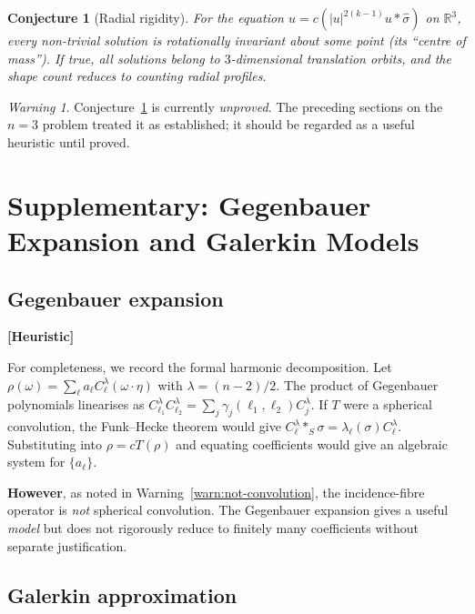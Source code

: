 \documentclass[12pt]{article}
\newtheorem{conjecture}[theorem]{Conjecture}
\theoremstyle{definition}
\theoremstyle{remark}
\newtheorem{warning}[theorem]{Warning}
\newcommand{\R}{\mathbb{R}}
\newcommand{\wh}{\widehat}
\newcommand{\heuristic}{\textbf{\color{purple}[Heuristic]}}
\begin{document}
\begin{conjecture}[Radial rigidity]
  \label{conj:radial}
  For the equation $u=c(|u|^{2(k-1)}u\ast\wh\sigma)$ on $\R^3$, every
  non-trivial solution is rotationally invariant about some point (its
  ``centre of mass'').  If true, all solutions belong to $3$-dimensional
  translation orbits, and the shape count reduces to counting radial profiles.
\end{conjecture}

\begin{warning}
  Conjecture~\ref{conj:radial} is currently \emph{unproved}.  The
  preceding sections on the $n=3$ problem treated it as established; it
  should be regarded as a useful heuristic until proved.
\end{warning}

\section{Supplementary: Gegenbauer Expansion and Galerkin Models}
\label{sec:galerkin}

\subsection{Gegenbauer expansion}
\heuristic

For completeness, we record the formal harmonic decomposition.
Let $\rho(\omega)=\sum_\ell a_\ell C_\ell^\lambda(\omega\cdot\eta)$ with
$\lambda=(n-2)/2$.  The product of Gegenbauer polynomials linearises as
$C_{\ell_1}^\lambda C_{\ell_2}^\lambda
=\sum_j\gamma_j(\ell_1,\ell_2)C_j^\lambda$.
If $T$ were a spherical convolution, the Funk--Hecke theorem would give
$C_\ell^\lambda\ast_S\sigma=\lambda_\ell(\sigma)C_\ell^\lambda$.
Substituting into $\rho=cT(\rho)$ and equating coefficients would give an
algebraic system for $\{a_\ell\}$.

\textbf{However}, as noted in Warning~\ref{warn:not-convolution}, the
incidence-fibre operator is \emph{not} spherical convolution.  The
Gegenbauer expansion gives a useful \emph{model} but does not rigorously
reduce to finitely many coefficients without separate justification.

\subsection{Galerkin approximation}
\end{document}
